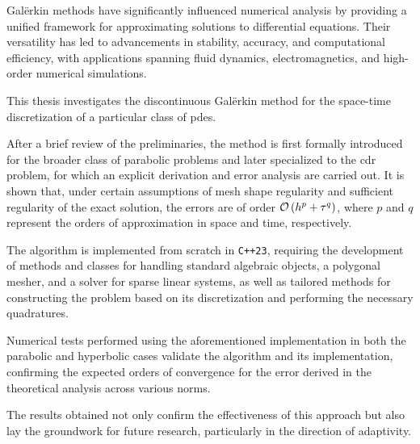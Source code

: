 Galërkin methods have significantly influenced numerical analysis by providing a unified framework for approximating solutions to differential equations. Their versatility has led to advancements in stability, accuracy, and computational efficiency, with applications spanning fluid dynamics, electromagnetics, and high-order numerical simulations.

This thesis investigates the discontinuous Galërkin method for the space-time discretization of a particular class of \acrfull{pdes}.

After a brief review of the preliminaries, the method is first formally introduced for the broader class of parabolic problems and later specialized to the \acrfull{cdr} problem, for which an explicit derivation and error analysis are carried out. It is shown that, under certain assumptions of mesh shape regularity and sufficient regularity of the exact solution, the errors are of order $\mathcal{O} \left( h^p + \tau^q \right)$, where $p$ and $q$ represent the orders of approximation in space and time, respectively.

The algorithm is implemented from scratch in \lstinline{C++23}, requiring the development of methods and classes for handling standard algebraic objects, a polygonal mesher, and a solver for sparse linear systems, as well as tailored methods for constructing the problem based on its discretization and performing the necessary quadratures.

Numerical tests performed using the aforementioned implementation in both the \\ parabolic and hyperbolic cases validate the algorithm and its implementation, confirming the expected orders of convergence for the error derived in the theoretical analysis across various norms.

The results obtained not only confirm the effectiveness of this approach but also lay the groundwork for future research, particularly in the direction of adaptivity.